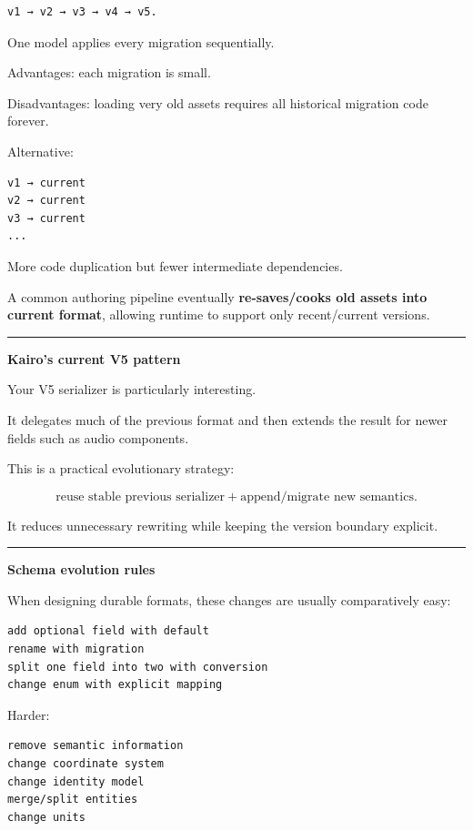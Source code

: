 \begin{verbatim}
v1 → v2 → v3 → v4 → v5.
\end{verbatim}

One model applies every migration sequentially.

Advantages: each migration is small.

Disadvantages: loading very old assets requires all historical migration code forever.

Alternative:

\begin{verbatim}
v1 → current
v2 → current
v3 → current
...
\end{verbatim}

More code duplication but fewer intermediate dependencies.

A common authoring pipeline eventually \textbf{re-saves/cooks old assets into current format}, allowing runtime to support only recent/current versions.

\begin{center}\rule{0.5\linewidth}{0.5pt}\end{center}

\textbf{Kairo's current V5 pattern}

Your V5 serializer is particularly interesting.

It delegates much of the previous format and then extends the result for newer fields such as audio components.

This is a practical evolutionary strategy:

\[
\text{reuse stable previous serializer}
+
\text{append/migrate new semantics}.
\]

It reduces unnecessary rewriting while keeping the version boundary explicit.

\begin{center}\rule{0.5\linewidth}{0.5pt}\end{center}

\textbf{Schema evolution rules}

When designing durable formats, these changes are usually comparatively easy:

\begin{verbatim}
add optional field with default
rename with migration
split one field into two with conversion
change enum with explicit mapping
\end{verbatim}

Harder:

\begin{verbatim}
remove semantic information
change coordinate system
change identity model
merge/split entities
change units
\end{verbatim}


